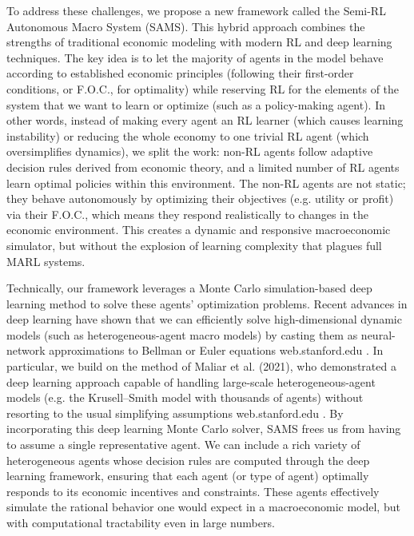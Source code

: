 \documentclass[11pt]{article}
\begin{document}
To address these challenges, we propose a new framework called the Semi-RL Autonomous Macro System (SAMS). This hybrid approach combines the strengths of traditional economic modeling with modern RL and deep learning techniques. The key idea is to let the majority of agents in the model behave according to established economic principles (following their first-order conditions, or F.O.C., for optimality) while reserving RL for the elements of the system that we want to learn or optimize (such as a policy-making agent). In other words, instead of making every agent an RL learner (which causes learning instability) or reducing the whole economy to one trivial RL agent (which oversimplifies dynamics), we split the work: non-RL agents follow adaptive decision rules derived from economic theory, and a limited number of RL agents learn optimal policies within this environment. The non-RL agents are not static; they behave autonomously by optimizing their objectives (e.g. utility or profit) via their F.O.C., which means they respond realistically to changes in the economic environment. This creates a dynamic and responsive macroeconomic simulator, but without the explosion of learning complexity that plagues full MARL systems. 

Technically, our framework leverages a Monte Carlo simulation-based deep learning method to solve these agents’ optimization problems. Recent advances in deep learning have shown that we can efficiently solve high-dimensional dynamic models (such as heterogeneous-agent macro models) by casting them as neural-network approximations to Bellman or Euler equations
web.stanford.edu
. In particular, we build on the method of Maliar et al. (2021), who demonstrated a deep learning approach capable of handling large-scale heterogeneous-agent models (e.g. the Krusell–Smith model with thousands of agents) without resorting to the usual simplifying assumptions
web.stanford.edu
. By incorporating this deep learning Monte Carlo solver, SAMS frees us from having to assume a single representative agent. We can include a rich variety of heterogeneous agents whose decision rules are computed through the deep learning framework, ensuring that each agent (or type of agent) optimally responds to its economic incentives and constraints. These agents effectively simulate the rational behavior one would expect in a macroeconomic model, but with computational tractability even in large numbers.
\end{document}
